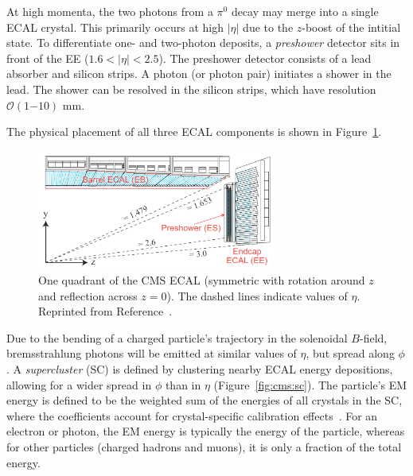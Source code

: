 At high momenta, the two photons from a $\pi^0$ decay may merge into a single ECAL crystal. 
This primarily occurs at high $|\eta|$ due to the $z$-boost of the intitial state.
To differentiate one- and two-photon deposits, a \emph{preshower} detector sits in front of the EE ($1.6 < |\eta|<2.5$).
The preshower detector consists of a lead absorber and silicon strips.
A photon (or photon pair) initiates a shower in the lead.
The shower can be resolved in the silicon strips, which have resolution $\mathcal{O}(1\mathrm{-}10)$ mm.

The physical placement of all three ECAL components is shown in Figure~\ref{fig:cms:ecal}.

\begin{figure}[]
    \begin{center} 
        \includegraphics[width=0.7\textwidth]{figures/cms/ecal.png}
        \caption{One quadrant of the CMS ECAL (symmetric with rotation around $z$ and reflection across $z=0$).
                 The dashed lines indicate values of $\eta$.
                 Reprinted from Reference~\cite{cmsecaljinst}.}
        \label{fig:cms:ecal}
    \end{center}
\end{figure}

Due to the bending of a charged particle's trajectory in the solenoidal $B$-field, bremsstrahlung photons will be emitted at similar values of $\eta$, but spread along $\phi$.
A \emph{supercluster} (SC) is defined by clustering nearby ECAL energy depositions, allowing for a wider spread in $\phi$ than in $\eta$ (Figure~\ref{fig:cms:sc}).
The particle's EM energy is defined to be the weighted sum of the energies of all crystals in the SC, where the coefficients account for crystal-specific calibration effects~\cite{cmsecalreco}.
For an electron or photon, the EM energy is typically the energy of the particle, whereas for other particles (charged hadrons and muons), it is only a fraction of the total energy.

